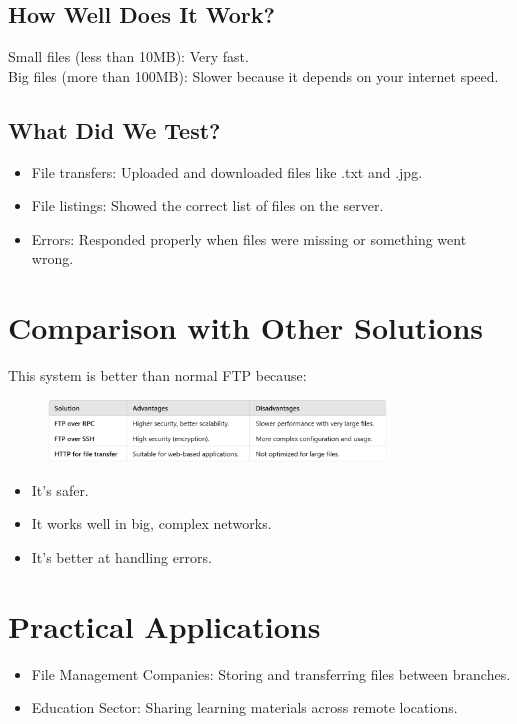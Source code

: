 \documentclass[a4paper,12pt]{article}
\begin{document}
\subsection{How Well Does It Work?}
Small files (less than 10MB): Very fast.\\
Big files (more than 100MB): Slower because it depends on your internet speed.

\subsection{What Did We Test?}
\begin{itemize}
    \item File transfers: Uploaded and downloaded files like .txt and .jpg.
    \item File listings: Showed the correct list of files on the server.
    \item Errors: Responded properly when files were missing or something went wrong.
\end{itemize}

\section{Comparison with Other Solutions}
This system is better than normal FTP because:
\begin{figure}[h]
    \centering
    \includegraphics[width=0.8\textwidth]{2.png} 
    \caption{}
\end{figure}
\begin{itemize}
    \item It’s safer.
    \item It works well in big, complex networks.
    \item It’s better at handling errors.
\end{itemize}

\section{Practical Applications}
\begin{itemize}
    \item File Management Companies: Storing and transferring files between branches.
    \item Education Sector: Sharing learning materials across remote locations.
\end{itemize}
\end{document}
